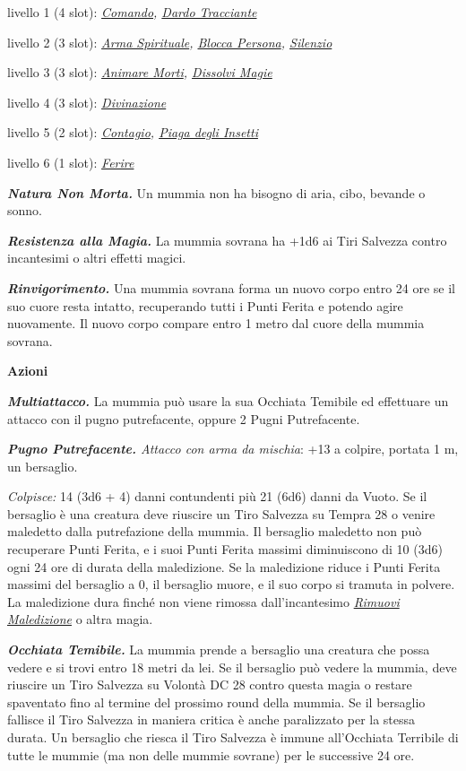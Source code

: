 \begin{multicols}{2}
{livello 1 (4 slot): \emph{\hyperlink{Comando}{Comando}, \hyperlink{Dardo Tracciante}{Dardo Tracciante}}

livello 2 (3 slot): \emph{\hyperlink{Arma Spirituale}{Arma Spirituale}, \hyperlink{Blocca Persona}{Blocca Persona}, \hyperlink{Silenzio}{Silenzio}}

livello 3 (3 slot): \emph{\hyperlink{Animare Morti}{Animare Morti}, \hyperlink{Dissolvi Magie}{Dissolvi Magie}}

livello 4 (3 slot): \emph{\hyperlink{Divinazione}{Divinazione}}

livello 5 (2 slot): \emph{\hyperlink{Contagio}{Contagio}, \hyperlink{Piaga degli Insetti}{Piaga degli Insetti}}

livello 6 (1 slot): \emph{\hyperlink{Ferire}{Ferire}}

\emph{\textbf{Natura Non Morta.}} Un mummia non ha bisogno di aria, cibo, bevande o sonno.

\emph{\textbf{Resistenza alla Magia.}} La mummia sovrana ha +1d6 ai Tiri Salvezza contro incantesimi o altri effetti magici.

\emph{\textbf{Rinvigorimento.}} Una mummia sovrana forma un nuovo corpo entro 24 ore se il suo cuore resta intatto, recuperando tutti i Punti Ferita e potendo agire nuovamente. Il nuovo corpo compare entro 1 metro dal cuore della mummia sovrana.

\textbf{Azioni}

\emph{\textbf{Multiattacco.}} La mummia può usare la sua Occhiata Temibile ed effettuare un attacco con il pugno putrefacente, oppure 2 Pugni Putrefacente.

\emph{\textbf{Pugno Putrefacente.} Attacco con arma da mischia}: +13 a colpire, portata 1 m, un bersaglio.

\emph{Colpisce:} 14 (3d6 + 4) danni contundenti più 21 (6d6) danni da Vuoto. Se il bersaglio è una creatura deve riuscire un Tiro Salvezza su Tempra 28 o venire maledetto dalla putrefazione della mummia. Il bersaglio maledetto non può recuperare Punti Ferita, e i suoi Punti Ferita massimi diminuiscono di 10 (3d6) ogni 24 ore di durata della maledizione. Se la maledizione riduce i Punti Ferita massimi del bersaglio a 0, il bersaglio muore, e il suo corpo si tramuta in polvere. La maledizione dura finché non viene rimossa dall'incantesimo \emph{\hyperlink{Rimuovi Maledizione}{Rimuovi Maledizione}} o altra magia.

\emph{\textbf{Occhiata Temibile.}} La mummia prende a bersaglio una creatura che possa vedere e si trovi entro 18 metri da lei. Se il bersaglio può vedere la mummia, deve riuscire un Tiro Salvezza su Volontà DC 28 contro questa magia o restare spaventato fino al termine del prossimo round della mummia. Se il bersaglio fallisce il Tiro Salvezza in maniera critica è anche paralizzato per la stessa durata. Un bersaglio che riesca il Tiro Salvezza è immune all'Occhiata Terribile di tutte le mummie (ma non delle mummie sovrane) per le successive 24 ore.

}
\end{multicols}
